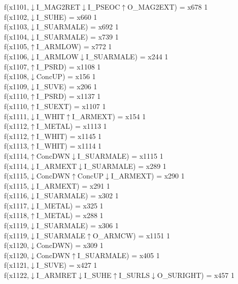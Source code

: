 f(x1101,$\downarrow$I\_MAG2RET$\downarrow$I\_PSEOC$\uparrow$O\_MAG2EXT) = x678 {1} \\
f(x1102,$\downarrow$I\_SUHE) = x660 {1} \\
f(x1103,$\downarrow$I\_SUARMALE) = x692 {1} \\
f(x1104,$\downarrow$I\_SUARMALE) = x739 {1} \\
f(x1105,$\uparrow$I\_ARMLOW) = x772 {1} \\
f(x1106,$\downarrow$I\_ARMLOW$\downarrow$I\_SUARMALE) = x244 {1} \\
f(x1107,$\uparrow$I\_PSRD) = x1108 {1} \\
f(x1108,$\downarrow$ConcUP) = x156 {1} \\
f(x1109,$\downarrow$I\_SUVE) = x206 {1} \\
f(x1110,$\uparrow$I\_PSRD) = x1137 {1} \\
f(x1110,$\uparrow$I\_SUEXT) = x1107 {1} \\
f(x1111,$\downarrow$I\_WHIT$\uparrow$I\_ARMEXT) = x154 {1} \\
f(x1112,$\uparrow$I\_METAL) = x1113 {1} \\
f(x1112,$\uparrow$I\_WHIT) = x1145 {1} \\
f(x1113,$\uparrow$I\_WHIT) = x1114 {1} \\
f(x1114,$\uparrow$ConcDWN$\downarrow$I\_SUARMALE) = x1115 {1} \\
f(x1114,$\downarrow$I\_ARMEXT$\downarrow$I\_SUARMALE) = x289 {1} \\
f(x1115,$\downarrow$ConcDWN$\uparrow$ConcUP$\downarrow$I\_ARMEXT) = x290 {1} \\
f(x1115,$\downarrow$I\_ARMEXT) = x291 {1} \\
f(x1116,$\downarrow$I\_SUARMALE) = x302 {1} \\
f(x1117,$\downarrow$I\_METAL) = x325 {1} \\
f(x1118,$\uparrow$I\_METAL) = x288 {1} \\
f(x1119,$\downarrow$I\_SUARMALE) = x306 {1} \\
f(x1119,$\downarrow$I\_SUARMALE$\uparrow$O\_ARMCW) = x1151 {1} \\
f(x1120,$\downarrow$ConcDWN) = x309 {1} \\
f(x1120,$\downarrow$ConcDWN$\uparrow$I\_SUARMALE) = x405 {1} \\
f(x1121,$\downarrow$I\_SUVE) = x427 {1} \\
f(x1122,$\downarrow$I\_ARMRET$\downarrow$I\_SUHE$\uparrow$I\_SURLS$\downarrow$O\_SURIGHT) = x457 {1} \\
